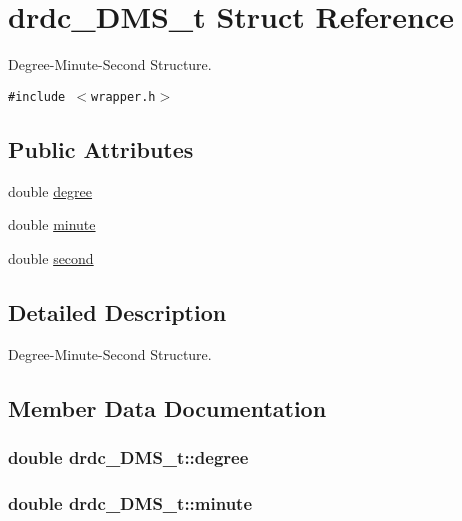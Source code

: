 \hypertarget{structdrdc__DMS__t}{
\section{drdc\_\-DMS\_\-t Struct Reference}
\label{structdrdc__DMS__t}
}
Degree-Minute-Second Structure.  


{\tt \#include $<$wrapper.h$>$}

\subsection*{Public Attributes}
\begin{CompactItemize}
\item 
double \hyperlink{structdrdc__DMS__t_5fc7c12adc1dde5b16096e4c05e22e62}{degree}
\item 
double \hyperlink{structdrdc__DMS__t_bc7d1e57cc7594b9030f7b55b669c4cb}{minute}
\item 
double \hyperlink{structdrdc__DMS__t_b7d6a7b2cb350650467f89e7a60a29dc}{second}
\end{CompactItemize}


\subsection{Detailed Description}
Degree-Minute-Second Structure. 



\subsection{Member Data Documentation}
\hypertarget{structdrdc__DMS__t_5fc7c12adc1dde5b16096e4c05e22e62}{
\subsubsection[degree]{\setlength{\rightskip}{0pt plus 5cm}double {\bf drdc\_\-DMS\_\-t::degree}}}
\label{structdrdc__DMS__t_5fc7c12adc1dde5b16096e4c05e22e62}


\hypertarget{structdrdc__DMS__t_bc7d1e57cc7594b9030f7b55b669c4cb}{
\subsubsection[minute]{\setlength{\rightskip}{0pt plus 5cm}double {\bf drdc\_\-DMS\_\-t::minute}}}
\label{structdrdc__DMS__t_bc7d1e57cc7594b9030f7b55b669c4cb}



